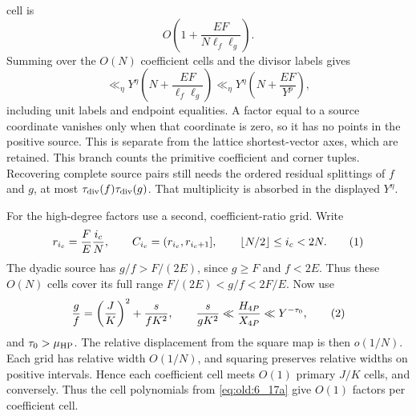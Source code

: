 cell is
\[
 O\left(1+\frac{EF}{ N \ell_f\ell_g}\right).
\]
Summing over the $O(N)$ coefficient cells and the divisor labels gives
\[
 \ll_\eta Y^\eta\left(N+\frac{EF}{ \ell_f\ell_g}\right)
 \ll_\eta Y^\eta\left(N+\frac{EF}{ Y^p}\right),
\]
including unit labels and endpoint equalities. A factor equal to a source
coordinate vanishes only when that coordinate is zero, so it has no points
in the positive source. This is separate from the lattice shortest-vector
axes, which are retained.
This branch counts the primitive coefficient and corner tuples.
Recovering complete source pairs still needs the ordered residual
splittings of \(f\) and \(g\), at most \(\tau_{\mathrm{div}}(f)\tau_{\mathrm{div}}(g)\).  That
multiplicity is absorbed in the displayed \(Y^\eta\).

For the high-degree factors use a second, coefficient-ratio grid.  Write
\[
 r_{i_c}=\frac FE\frac{i_c}{N},\qquad
 C_{i_c}=(r_{i_c},r_{i_c+1}],\qquad
 \lfloor N/2\rfloor\le i_c<2N.
\AutoTag{eq:old:6_19a}
\]
The dyadic source has \(g/f>F/(2E)\), since \(g\ge F\) and \(f<2E\).
Thus these \(O(N)\) cells cover its full range
\(F/(2E)<g/f<2F/E\).  Now use
\[
 \frac{g}{ f}=\left(\frac{J}{ K}\right)^2+\frac{s}{ fK^2},
 \qquad \frac{s}{gK^2}\ll \frac{H_{4P}}{X_{4P}}\ll Y^{-\tau_0},
\AutoTag{eq:old:6_19b}
\]
and $\tau_0>\mu_{\rm HP}$.  The relative displacement from the square map is
then $o(1/N)$.  Each grid has relative width $O(1/N)$, and squaring
preserves relative widths on positive intervals.  Hence each coefficient
cell meets $O(1)$ primary $J/K$ cells, and conversely.  Thus the cell
polynomials from \eqref{eq:old:6_17a} give $O(1)$ factors per coefficient
cell.

